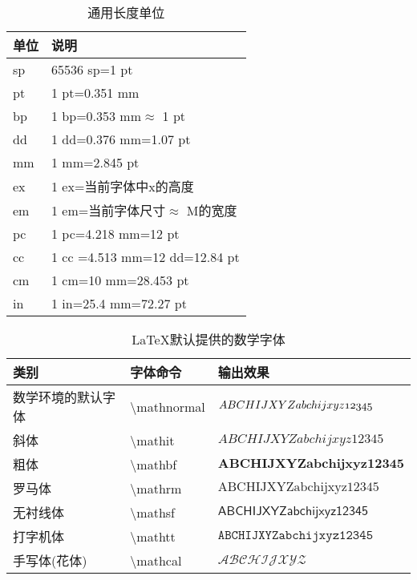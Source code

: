 \documentclass[UTF8,fontset=ubuntu]{ctexart}
\begin{document}
\begin{table}[H]
\begin{tabular}{l l}
	\hline
	单位 & 说明\\
	\hline
	sp & 65536 sp=1 pt\\
	pt & 1 pt=0.351 mm\\
	bp & 1 bp=0.353 mm$\approx$ 1 pt\\
	dd & 1 dd=0.376 mm=1.07 pt\\
	mm & 1 mm=2.845 pt\\
	ex & 1 ex=当前字体中x的高度\\
	em & 1 em=当前字体尺寸$\approx$ M的宽度\\
	pc & 1 pc=4.218 mm=12 pt\\
	cc & 1 cc =4.513 mm=12 dd=12.84 pt\\
	cm & 1 cm=10 mm=28.453 pt\\
	in & 1 in=25.4 mm=72.27 pt\\
	\hline
\end{tabular}
\caption{通用长度单位}
\end{table}

\begin{table}
\begin{minipage}{\textwidth}
\begin{tabular}{l l l}
	\hline
	类别 & 字体命令 & 输出效果\\\hline
	数学环境的默认字体 & \textbackslash  mathnormal & $\mathnormal{ABCHIJXYZabchijxyz12345}$\\
	斜体 & \textbackslash  mathit & $\mathit{ABCHIJXYZabchijxyz12345}$\\
	粗体 & \textbackslash  mathbf & $\mathbf{ABCHIJXYZabchijxyz12345}$\\
	罗马体 & \textbackslash  mathrm & $\mathrm{ABCHIJXYZabchijxyz12345}$\\
	无衬线体 & \textbackslash  mathsf & $\mathsf{ABCHIJXYZabchijxyz12345}$\\
	打字机体 & \textbackslash  mathtt & $\mathtt{ABCHIJXYZabchijxyz12345}$\\
	手写体(花体)\footnotemark[1] & \textbackslash  mathcal & $\mathcal{ABCHIJXYZ}$\\\hline
\end{tabular}
\end{minipage}
\caption{LaTeX默认提供的数学字体}
\end{table}
\end{document}
